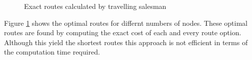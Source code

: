 \documentclass[a4paper,12pt,twoside]{article}
\begin{document}
\begin{figure}[H]
	\centering
	
	\caption{Exact routes calculated by travelling salesman}
	\label{fig:exact_routes_calculated_by_travelling_salesman}
\end{figure}

Figure \ref{fig:exact_routes_calculated_by_travelling_salesman} shows the optimal routes for differnt numbers of nodes. These optimal routes are found by computing the exact cost of each and every route option. Although this yield the shortest routes this approach is not efficient in terms of the computation time required.
\end{document}
